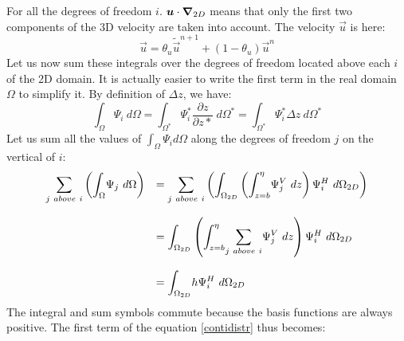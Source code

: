 For all the degrees of freedom $i$. $\bm{u}\cdot\bm{\nabla}_{2D}$ means that
only the first two components of the 3D velocity are taken into account.
The velocity $\vec{u}$ is here:%
\begin{equation}
\vec{u}=\theta_{u}\tilde{\vec{u}}^{n+1}+(1-\theta_{u})\vec{u}^{n}
\end{equation}
%
Let us now sum these integrals over the degrees of freedom located above each $i$ of the 2D domain.
It is actually easier to write the first term in the real domain $\Omega$ to simplify it.
By definition of $\Delta z$, we have:
\begin{equation}
\displaystyle{\int_{\Omega}}\Psi_i~d\Omega=
\displaystyle{\int_{\Omega^*}}\Psi_i^*\dfrac{\partial z}{\partial z *}~d\Omega^*=
\displaystyle{\int_{\Omega^*}}\Psi_i^*\Delta z~d\Omega^*
\end{equation}
Let us sum all the values of $\displaystyle{\int_{\Omega}}\Psi_id\Omega$
along the degrees of freedom $j$ on the vertical of $i$:
\begin{equation}
\begin{array}{ll}
\displaystyle{\sum_{j~above~i}}\left(\displaystyle{\int_{\Omega}}\Psi_j~d\Omega\right)&=
\displaystyle{\sum_{j~above~i}}\left(\displaystyle{\int_{\Omega_{2D}}}\left(\displaystyle{\int_{z=b}^{\eta}}\Psi_j^V~dz\right)\Psi_i^H~d\Omega_{2D}\right)\bigskip\\
& = \displaystyle{\int_{\Omega_{2D}}}\left(\displaystyle{\int_{z=b}^{\eta}}\displaystyle{\sum_{j~above~i}}\Psi_j^V~dz\right)\Psi_i^H~d\Omega_{2D}\bigskip\\
& = \displaystyle{\int_{\Omega_{2D}}}h\Psi_i^H~d\Omega_{2D}
\end{array}
\end{equation}
The integral and sum symbols commute because the basis functions are always positive.
The first term of the equation \eqref{contidistr} thus becomes:
